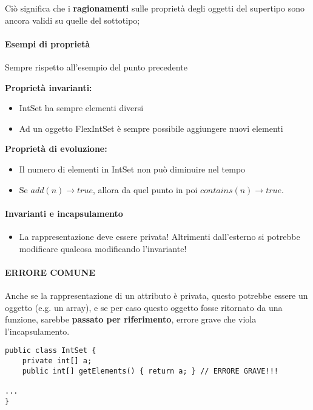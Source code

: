 \documentclass[a4paper,10pt]{article}
\begin{document}
Ciò significa che i \textbf{ragionamenti} sulle proprietà degli oggetti del supertipo sono ancora validi su quelle del sottotipo; 

\paragraph{Esempi di proprietà}
Sempre rispetto all'esempio del punto precedente\smallskip

\textbf{Proprietà invarianti:}
\begin{itemize}
 \item  IntSet ha sempre elementi diversi
 \item Ad un oggetto FlexIntSet è sempre possibile aggiungere nuovi elementi
\end{itemize}
\smallskip

\textbf{Proprietà di evoluzione:}
\begin{itemize}
 \item Il numero di elementi in IntSet non può diminuire nel tempo
 \item Se $add(n) \to true$, allora da quel punto in poi $contains(n) \to true$.
\end{itemize}

\paragraph{Invarianti e incapsulamento}
\begin{itemize}
 \item La rappresentazione deve essere privata! Altrimenti dall'esterno si potrebbe modificare qualcosa modificando l'invariante!
\end{itemize}

\paragraph{ERRORE COMUNE} Anche se la rappresentazione di un attributo è privata, questo potrebbe essere un oggetto (e.g. un array), e se per caso questo oggetto fosse ritornato da una funzione, sarebbe \textbf{passato per riferimento}, errore grave che viola l'incapsulamento.

\begin{lstlisting}
public class IntSet {
    private int[] a;
    public int[] getElements() { return a; } // ERRORE GRAVE!!!
    
...
}
\end{lstlisting}
\end{document}
